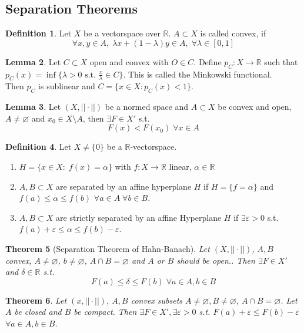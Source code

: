 \documentclass[a4paper, 12pt]{article}
\theoremstyle{plain}
\newtheorem{theorem}{Theorem}[subsection] %
\theoremstyle{definition}
\newtheorem{definition}[theorem]{Definition} %
\theoremstyle{lemma}
\newtheorem{lemma}[theorem]{Lemma}
\theoremstyle{remark}
\theoremstyle{corollary}
\theoremstyle{example}
\begin{document}
	\subsection{Separation Theorems}
	\begin{definition}
		Let $X$ be a vectorspace over $\mathbb{R}$. $A\subset X$ is called convex, if \[\forall x,y \in A, \; \lambda x + (1-\lambda) y \in A, \; \forall \lambda \in [0,1]\]
	\end{definition}
	\begin{lemma}
		Let $C\subset X$ open and convex with $O \in C$. Define $p_C: X \to \mathbb{R}$ such that $p_C(x) = \inf\{\lambda > 0 \text{ s.t. } \frac{x}{\lambda} \in C\}$. This is called the Minkowski functional.\\
		Then $p_C$ is sublinear and $C = \{x \in X: p_C(x) < 1\}$.
	\end{lemma}
	\begin{lemma}
		Let $(X,||\cdot ||)$ be a normed space and $A\subset X$ be convex and open, $A \neq \varnothing$ and $x_0 \in X\setminus A$, then $\exists F \in X'$ s.t. \[F(x) < F(x_0) \; \forall x \in A\]
	\end{lemma}
	\begin{definition}
		Let $X\neq \{0\}$ be a $\mathbb{R}$-vectorspace. \begin{enumerate}
			\item $H = \{x \in X: \; f(x) = \alpha\}$ with $f: X \to \mathbb{R}$ linear, $\alpha \in \mathbb{R}$
			\item $A,B \subset X$ are separated by an affine hyperplane $H$ if $H = \{f = \alpha\}$ and $f(a) \leq \alpha \leq f(b)$ $\forall a \in A\; \forall b \in B$.
			\item $A,B \subset X$ are strictly separated by an affine Hyperplane $H$ if $\exists \varepsilon > 0$ s.t. $f(a) + \varepsilon \leq \alpha \leq f(b) - \varepsilon$.
		\end{enumerate}
	\end{definition}
	\begin{theorem}[Separation Theorem of Hahn-Banach]
		Let $(X, ||\cdot ||)$, $A,B$ convex, $A \neq \varnothing$, $b \neq \varnothing$, $A\cap B = \varnothing$ and $A$ or $B$ should be open.. Then $\exists F \in X'$ and $\delta \in \mathbb{R}$ s.t. \[F(a) \leq \delta \leq F(b) \; \forall a \in A, b \in B\]
	\end{theorem}
	\begin{theorem}
		Let $(x,||\cdot ||)$, $A, B$ convex subsets $A \neq \varnothing, B \neq \varnothing$, $A \cap B = \varnothing$. Let $A$ be closed and $B$ be compact. Then $\exists F \in X', \exists \varepsilon > 0$ s.t. $F(a) + \varepsilon \leq F(b) - \varepsilon$ $\forall a \in A, b \in B$.
	\end{theorem}
\end{document}
